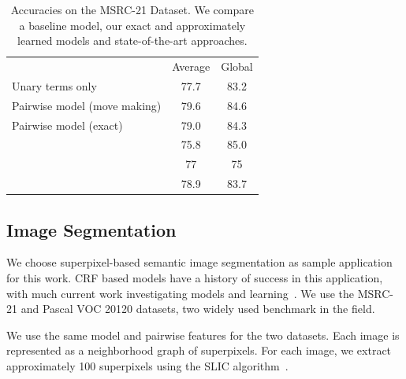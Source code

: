 \begin{table}
    \begin{center}
    \begin{tabular}{lcc}
        \toprule
                    & Average & Global \\
        \cmidrule{1-3}
    Unary terms only & 77.7& 83.2 \\
    Pairwise model (move making)& 79.6&84.6\\
    Pairwise model (exact)& 79.0 & 84.3\\
        \cmidrule{1-3}
    \citet{ladicky2009associative} & 75.8& 85.0\\
    \citet{gonfaus2010harmony} & 77&  75\\
    \citet{lucchi2013learning} & 78.9& 83.7\\
    \bottomrule
    \end{tabular}
    \end{center}
    \caption{Accuracies on the MSRC-21 Dataset.  We compare a baseline model,
    our exact and approximately learned models and state-of-the-art
    approaches.\label{msrcacc}}
    
\end{table}




\subsection{Image Segmentation}
We choose superpixel-based semantic image segmentation as sample application
for this work.  CRF based models have a history of success in this application,
with much current work investigating models and
learning~\citep{gonfaus2010harmony, lucchi2013learning, ladicky2009associative,
kohli2009robust, krahenbuhl2012efficient}.  We use the MSRC-21 and Pascal VOC 20120 datasets, two
widely used benchmark in the field.

We use the same model and pairwise features for the two datasets.
Each image is represented as a neighborhood graph of superpixels.
For each image, we extract approximately 100 superpixels using 
the SLIC algorithm~\citep{achanta2012slic}.

